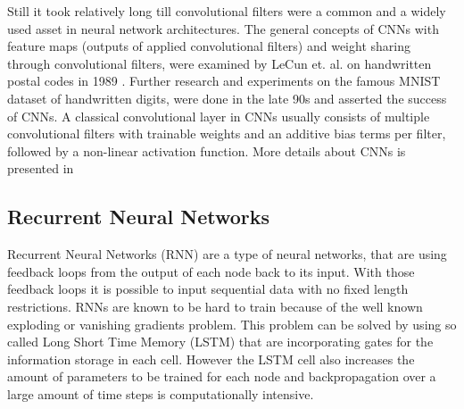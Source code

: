 Still it took relatively long till convolutional filters were a common and a widely used asset in neural network architectures.
The general concepts of CNNs with feature maps (outputs of applied convolutional filters) and weight sharing through convolutional filters, were examined by LeCun et. al. on handwritten postal codes in 1989 \cite{LeCun1989_Generalization}.
Further research and experiments on the famous MNIST dataset of handwritten digits, were done in the late 90s \cite{LeCun1998} and asserted the success of CNNs.
A classical convolutional layer in CNNs usually consists of multiple convolutional filters with trainable weights and an additive bias terms per filter, followed by a non-linear activation function.
More details about CNNs is presented in



  



\subsection{Recurrent Neural Networks}\label{sec:prev_nn_rnn}
Recurrent Neural Networks (RNN) are a type of neural networks, that are using feedback loops from the output of each node back to its input.
With those feedback loops it is possible to input sequential data with no fixed length restrictions.
RNNs are known to be hard to train because of the well known exploding or vanishing gradients problem.
This problem can be solved by using so called Long Short Time Memory (LSTM) that are incorporating gates for the information storage in each cell. 
However the LSTM cell also increases the amount of parameters to be trained for each node and backpropagation over a large amount of time steps is computationally intensive.


